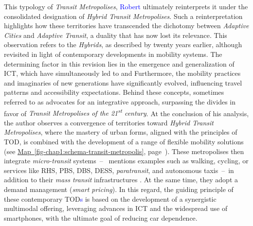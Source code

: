 \begin{refsegment}
This typology of \textsl{Transit Metropolises}, \textcolor{blue}{Robert} \textcolor{blue}{\textcite[131]{cervero_transit_2020}} ultimately reinterprets it under the consolidated designation of \textsl{Hybrid Transit Metropolises}. Such a reinterpretation highlights how these territories have transcended the dichotomy between \textsl{Adaptive Cities} and \textsl{Adaptive Transit}, a duality that has now lost its relevance. This observation refers to the \textsl{Hybrids}, as described by \textcolor{blue}{\textcite[213-295]{cervero_transit_1998}} twenty years earlier, although revisited in light of contemporary developments in mobility systems. The determining factor in this revision lies in the emergence and generalization of \acrshort{ICT}, which have simultaneously led to  and  Furthermore, the mobility practices and imaginaries of new generations have significantly evolved, influencing travel patterns and accessibility expectations. Behind these concepts, sometimes referred to as  \textcolor{blue}{\textcite[137-143]{cervero_transit_2020}} advocates for an integrative approach, surpassing the divides in favor of \textsl{Transit Metropolises of the 21\textsuperscript{st} century}. At the conclusion of his analysis, the author observes a convergence of territories toward \textsl{Hybrid Transit Metropolises}, where the mastery of urban forms, aligned with the principles of \acrshort{TOD}, is combined with the development of a range of flexible  mobility solutions (see \hyperref[fig-chap1:schema-transit-metropolis]{Map~\ref{fig-chap1:schema-transit-metropolis}}, page~\pageref{fig-chap1:schema-transit-metropolis}). These metropolises then integrate \textsl{micro-transit} systems~–~\textcolor{blue}{\textcite[144]{cervero_transit_2020}} mentions examples such as walking, cycling, or services like \acrfull{RHS}, \acrfull{PBS}, \acrfull{DBS}, \acrfull{DESS}, \textsl{paratransit}, and autonomous taxis~–~in addition to their \textsl{mass transit} infrastructures \textcolor{blue}{\autocite[7]{thomas_transit-oriented_2020}}. At the same time, they adopt a  demand management (\textsl{smart pricing}). In this regard, the guiding principle of these contemporary \acrshort{TOD}\textcolor{blue}{s} is based on the development of a synergistic multimodal offering, leveraging advances in \acrshort{ICT} and the widespread use of smartphones, with the ultimate goal of reducing car dependence.%


\end{refsegment}
